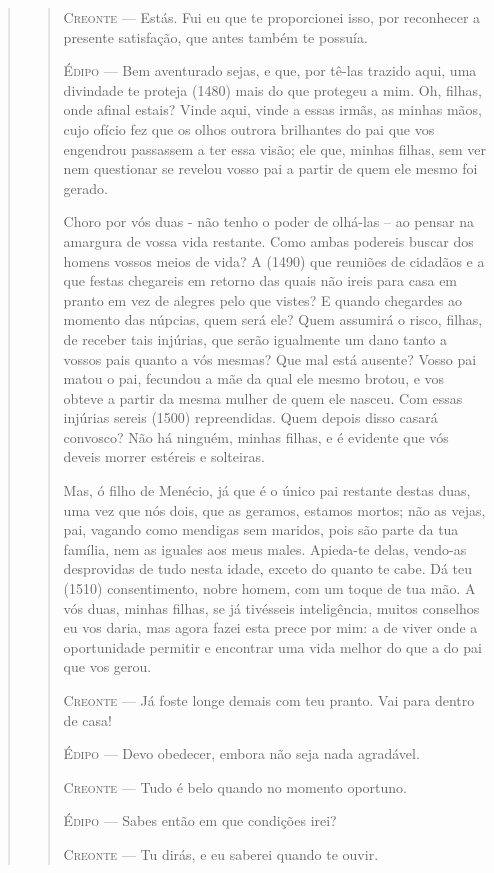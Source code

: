 \begin{verse}
\begin{verse}
\textsc{Creonte} --- Estás. Fui eu que te proporcionei isso, por reconhecer a presente
satisfação, que antes também te possuía.

\textsc{Édipo} --- Bem aventurado sejas, e que, por tê-las trazido aqui, uma divindade te
proteja (1480) mais do que protegeu a mim. Oh, filhas, onde afinal
estais? Vinde aqui, vinde a essas irmãs, as minhas mãos, cujo ofício fez
que os olhos outrora brilhantes do pai que vos engendrou passassem a ter
essa visão; ele que, minhas filhas, sem ver nem questionar se revelou
vosso pai a partir de quem ele mesmo foi gerado.

Choro por vós duas - não tenho o poder de olhá-las -- ao pensar na
amargura de vossa vida restante. Como ambas podereis buscar dos homens
vossos meios de vida? A (1490) que reuniões de cidadãos e a que festas
chegareis em retorno das quais não ireis para casa em pranto em vez de
alegres pelo que vistes? E quando chegardes ao momento das núpcias, quem
será ele? Quem assumirá o risco, filhas, de receber tais injúrias, que
serão igualmente um dano tanto a vossos pais quanto a vós mesmas? Que
mal está ausente? Vosso pai matou o pai, fecundou a mãe da qual ele
mesmo brotou, e vos obteve a partir da mesma mulher de quem ele nasceu.
Com essas injúrias sereis (1500) repreendidas. Quem depois disso casará
convosco? Não há ninguém, minhas filhas, e é evidente que vós deveis
morrer estéreis e solteiras.

Mas, ó filho de Menécio, já que é o único pai restante destas duas, uma
vez que nós dois, que as geramos, estamos mortos; não as vejas, pai,
vagando como mendigas sem maridos, pois são parte da tua família, nem as
iguales aos meus males. Apieda-te delas, vendo-as desprovidas de tudo
nesta idade, exceto do quanto te cabe. Dá teu (1510) consentimento,
nobre homem, com um toque de tua mão. A vós duas, minhas filhas, se já
tivésseis inteligência, muitos conselhos eu vos daria, mas agora fazei
esta prece por mim: a de viver onde a oportunidade permitir e encontrar
uma vida melhor do que a do pai que vos gerou.

\textsc{Creonte} --- Já foste longe demais com teu pranto. Vai para dentro de casa!

\textsc{Édipo} --- Devo obedecer, embora não seja nada agradável.

\textsc{Creonte} --- Tudo é belo quando no momento oportuno.

\textsc{Édipo} --- Sabes então em que condições irei?

\textsc{Creonte} --- Tu dirás, e eu saberei quando te ouvir.


\end{verse}
\end{verse}
